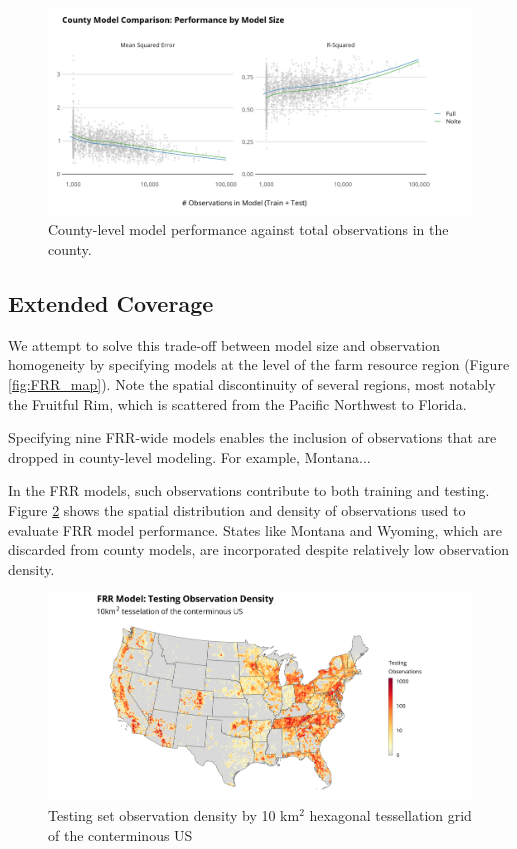\documentclass[12pt]{article}
\begin{document}
\begin{figure}
    \centering
    \includegraphics[width=1\textwidth]{exhibits/compare_county_nobs_perf.png}
    \caption{County-level model performance against total observations in the county.}
    \label{fig:compare_county_nobs_perf}
\end{figure}

\subsection{Extended Coverage}

We attempt to solve this trade-off between model size and observation homogeneity by specifying models at the level of the farm resource region (Figure \ref{fig:FRR_map}). Note the spatial discontinuity of several regions, most notably the Fruitful Rim, which is scattered from the Pacific Northwest to Florida.

Specifying nine FRR-wide models enables the inclusion of observations that are dropped in county-level modeling. For example, Montana...

In the FRR models, such observations contribute to both training and testing. Figure \ref{fig:frr_test_density} shows the spatial distribution and density of observations used to evaluate FRR model performance. States like Montana and Wyoming, which are discarded from county models, are incorporated despite relatively low observation density. 

\begin{figure}
    \centering
    \includegraphics[width=1\textwidth]{exhibits/frr_test_density.png}
    \caption{Testing set observation density by 10 km$^2$ hexagonal tessellation grid of the conterminous US}
    \label{fig:frr_test_density}
\end{figure}
\end{document}
